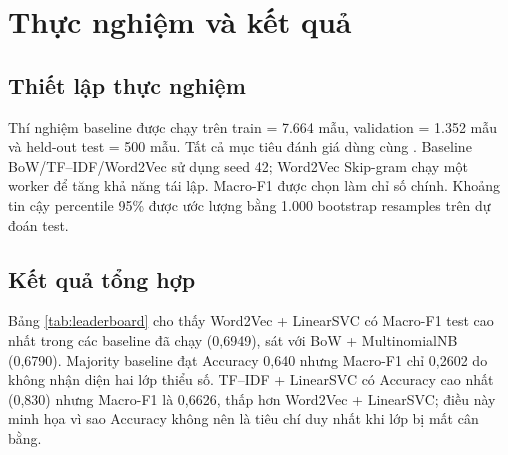 \chapter{Thực nghiệm và kết quả}

\section{Thiết lập thực nghiệm}
Thí nghiệm baseline được chạy trên train = 7.664 mẫu, validation = 1.352 mẫu và held-out test = 500 mẫu. Tất cả mục tiêu đánh giá dùng cùng . Baseline BoW/TF--IDF/Word2Vec sử dụng seed 42; Word2Vec Skip-gram chạy một worker để tăng khả năng tái lập. Macro-F1 được chọn làm chỉ số chính. Khoảng tin cậy percentile 95\% được ước lượng bằng 1.000 bootstrap resamples trên dự đoán test.

\section{Kết quả tổng hợp}
Bảng \ref{tab:leaderboard} cho thấy Word2Vec + LinearSVC có Macro-F1 test cao nhất trong các baseline đã chạy (0,6949), sát với BoW + MultinomialNB (0,6790). Majority baseline đạt Accuracy 0,640 nhưng Macro-F1 chỉ 0,2602 do không nhận diện hai lớp thiểu số. TF--IDF + LinearSVC có Accuracy cao nhất (0,830) nhưng Macro-F1 là 0,6626, thấp hơn Word2Vec + LinearSVC; điều này minh họa vì sao Accuracy không nên là tiêu chí duy nhất khi lớp bị mất cân bằng.

\begin{table}[H]
\centering
\caption{So sánh baseline trên held-out pseudo-labeled test}
\label{tab:leaderboard}
\small
{}
\end{table}

